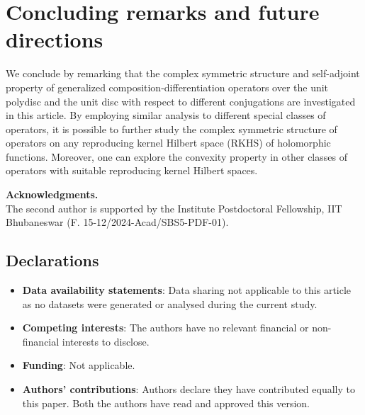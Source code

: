 \documentclass[12pt, reqno]{amsart}
\theoremstyle{definition}
\theoremstyle{remark}
\numberwithin{equation}{section}
\begin{document}
\section{Concluding remarks and future directions}

We conclude by remarking that the complex symmetric structure and self-adjoint property of generalized composition-differentiation operators over the unit polydisc and the unit disc with respect to different conjugations are investigated in this article. By employing similar analysis to different special classes of operators, it is possible to further study the complex symmetric structure of operators on any reproducing kernel Hilbert space (RKHS) of holomorphic functions. Moreover, one can explore the convexity property in other classes of operators with suitable reproducing kernel Hilbert spaces.

\vspace{.3cm}
	\noindent
	{\small {\bf Acknowledgments.}\\
	 The second author is supported by the Institute Postdoctoral Fellowship, IIT Bhubaneswar (F. 15-12/2024-Acad/SBS5-PDF-01).
	}



\subsection*{Declarations}
\begin{itemize}
\item {\bf{Data availability statements}}: Data sharing not applicable to this article as no datasets were generated or analysed during the current study.
\item {\bf{Competing interests}}: The authors have no relevant financial or non-financial interests to disclose.
\item {\bf{Funding}}: Not applicable.
\item {\bf{Authors' contributions}}: Authors declare they have contributed equally to this paper. Both the authors have read and approved this version.
\end{itemize}







\end{document}
